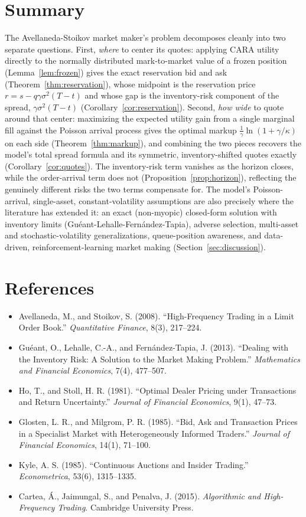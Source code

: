 \documentclass[11pt]{article}
\theoremstyle{remark}
\theoremstyle{definition}
\begin{document}
\section{Summary}
\label{sec:summary}

The Avellaneda-Stoikov market maker's problem decomposes cleanly into two separate questions. First, \emph{where} to center its quotes: applying CARA utility directly to the normally distributed mark-to-market value of a frozen position (Lemma~\ref{lem:frozen}) gives the exact reservation bid and ask (Theorem~\ref{thm:reservation}), whose midpoint is the reservation price $r=s-q\gamma\sigma^2(T-t)$ and whose gap is the inventory-risk component of the spread, $\gamma\sigma^2(T-t)$ (Corollary~\ref{cor:reservation}). Second, \emph{how wide} to quote around that center: maximizing the expected utility gain from a single marginal fill against the Poisson arrival process gives the optimal markup $\tfrac1\gamma\ln(1+\gamma/\kappa)$ on each side (Theorem~\ref{thm:markup}), and combining the two pieces recovers the model's total spread formula and its symmetric, inventory-shifted quotes exactly (Corollary~\ref{cor:quotes}). The inventory-risk term vanishes as the horizon closes, while the order-arrival term does not (Proposition~\ref{prop:horizon}), reflecting the genuinely different risks the two terms compensate for. The model's Poisson-arrival, single-asset, constant-volatility assumptions are also precisely where the literature has extended it: an exact (non-myopic) closed-form solution with inventory limits (Guéant-Lehalle-Fernández-Tapia), adverse selection, multi-asset and stochastic-volatility generalizations, queue-position awareness, and data-driven, reinforcement-learning market making (Section~\ref{sec:discussion}).

\section*{References}
\begin{itemize}
\item Avellaneda, M., and Stoikov, S. (2008). ``High-Frequency Trading in a Limit Order Book.'' \textit{Quantitative Finance}, 8(3), 217--224.
\item Guéant, O., Lehalle, C.-A., and Fernández-Tapia, J. (2013). ``Dealing with the Inventory Risk: A Solution to the Market Making Problem.'' \textit{Mathematics and Financial Economics}, 7(4), 477--507.
\item Ho, T., and Stoll, H. R. (1981). ``Optimal Dealer Pricing under Transactions and Return Uncertainty.'' \textit{Journal of Financial Economics}, 9(1), 47--73.
\item Glosten, L. R., and Milgrom, P. R. (1985). ``Bid, Ask and Transaction Prices in a Specialist Market with Heterogeneously Informed Traders.'' \textit{Journal of Financial Economics}, 14(1), 71--100.
\item Kyle, A. S. (1985). ``Continuous Auctions and Insider Trading.'' \textit{Econometrica}, 53(6), 1315--1335.
\item Cartea, \'A., Jaimungal, S., and Penalva, J. (2015). \textit{Algorithmic and High-Frequency Trading}. Cambridge University Press.
\end{itemize}
\end{document}
